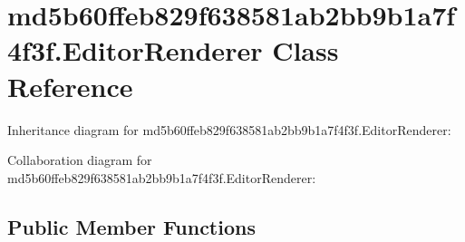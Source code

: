\hypertarget{classmd5b60ffeb829f638581ab2bb9b1a7f4f3f_1_1_editor_renderer}{}\section{md5b60ffeb829f638581ab2bb9b1a7f4f3f.\+Editor\+Renderer Class Reference}
\label{classmd5b60ffeb829f638581ab2bb9b1a7f4f3f_1_1_editor_renderer}


Inheritance diagram for md5b60ffeb829f638581ab2bb9b1a7f4f3f.\+Editor\+Renderer\+:


Collaboration diagram for md5b60ffeb829f638581ab2bb9b1a7f4f3f.\+Editor\+Renderer\+:
\subsection*{Public Member Functions}
